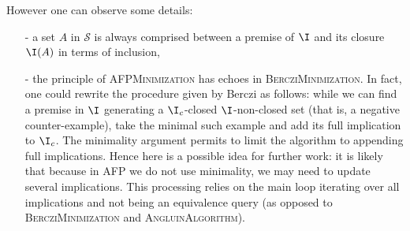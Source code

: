However one can observe some details:
\begin{itemize}
	\item[-] a set $A$ in $\mathcal{S}$ is always comprised between a premise
	of $\I$ and its closure $\I(A)$ in terms of inclusion,
	\item[-] the principle of \textsc{AFPMinimization} has echoes in \textsc{BercziMinimization}. In fact, one could rewrite the procedure 
	given by Berczi as follows: while we can find a premise in $\I$ generating a $\I_c$-closed $\I$-non-closed set (that is, a negative counter-example),
	take the minimal such example and add its full implication to $\I_c$. The minimality argument permits to limit the algorithm to appending full implications. Hence here is a possible idea for further work: it is likely that because in \textsc{AFP} we do not use minimality, we may need to update several implications. This processing relies on the main loop iterating over all implications and not being an equivalence query (as opposed to \textsc{BercziMinimization} and \textsc{AngluinAlgorithm}).
\end{itemize}

